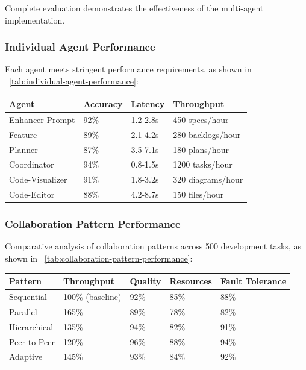Complete evaluation demonstrates the effectiveness of the multi-agent implementation.

\subsubsection*{Individual Agent Performance}

Each agent meets stringent performance requirements, as shown in ~\ref{tab:individual-agent-performance}:

\begin{center}
\begin{tabular}{@{}llll@{}}
\toprule
\textbf{Agent} & \textbf{Accuracy} & \textbf{Latency} & \textbf{Throughput} \\
\midrule
Enhancer-Prompt & 92\% & 1.2-2.8s & 450 specs/hour \\
Feature & 89\% & 2.1-4.2s & 280 backlogs/hour \\
Planner & 87\% & 3.5-7.1s & 180 plans/hour \\
Coordinator & 94\% & 0.8-1.5s & 1200 tasks/hour \\
Code-Visualizer & 91\% & 1.8-3.2s & 320 diagrams/hour \\
Code-Editor & 88\% & 4.2-8.7s & 150 files/hour \\
\bottomrule
\end{tabular}
\label{tab:individual-agent-performance}
\end{center}

\subsubsection*{Collaboration Pattern Performance}

Comparative analysis of collaboration patterns across 500 development tasks, as shown in ~\ref{tab:collaboration-pattern-performance}:

\begin{center}
\begin{tabular}{@{}lllll@{}}
\toprule
\textbf{Pattern} & \textbf{Throughput} & \textbf{Quality} & \textbf{Resources} & \textbf{Fault Tolerance} \\
\midrule
Sequential & 100\% (baseline) & 92\% & 85\% & 88\% \\
Parallel & 165\% & 89\% & 78\% & 82\% \\
Hierarchical & 135\% & 94\% & 82\% & 91\% \\
Peer-to-Peer & 120\% & 96\% & 88\% & 94\% \\
Adaptive & 145\% & 93\% & 84\% & 92\% \\
\bottomrule
\end{tabular}
\label{tab:collaboration-pattern-performance}
\end{center}


